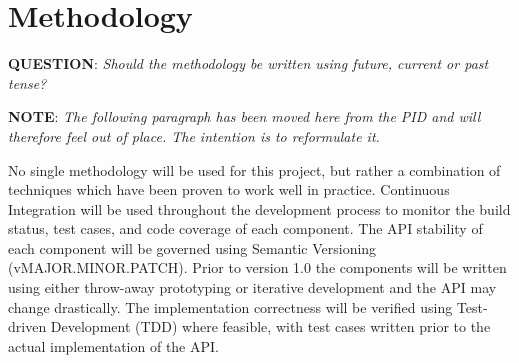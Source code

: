 

\section{Methodology}
\label{sec:methodology}




\textbf{QUESTION}: \textit{Should the methodology be written using future, current or past tense?}



\textbf{NOTE}: \textit{The following paragraph has been moved here from the PID and will therefore feel out of place. The intention is to reformulate it.}

No single methodology will be used for this project, but rather a combination of techniques which have been proven to work well in practice. Continuous Integration will be used throughout the development process to monitor the build status, test cases, and code coverage of each component. The API stability of each component will be governed using Semantic Versioning (vMAJOR.MINOR.PATCH). Prior to version 1.0 the components will be written using either throw-away prototyping or iterative development and the API may change drastically. The implementation correctness will be verified using Test-driven Development (TDD) where feasible, with test cases written prior to the actual implementation of the API.








